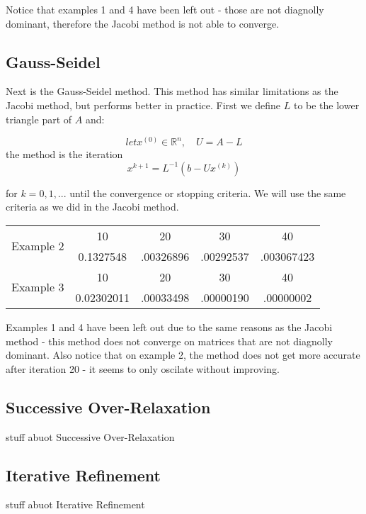 \documentclass[11pt]{article}	%
\begin{document}
    Notice that examples 1 and 4 have been left out - those are not diagnolly dominant, therefore the Jacobi method
    is not able to converge.

\subsection{Gauss-Seidel}
Next is the Gauss-Seidel method. This method has similar limitations as the Jacobi method, but performs better in practice.
First we define $L$ to be the lower triangle part of $A$ and:

\begin{equation}\label{eq:jacobi-eq-1}
    let x^{(0)}\in {\mathbb R}^n, \quad U = A - L
\end{equation}
the method is the iteration
\begin{equation}\label{eq:jacobi-eq-1}
    x^{k+1} = L^{-1}(b - Ux^{(k)})
\end{equation}

for $k = 0, 1, ...$ until the convergence or stopping criteria. We will use the same criteria as we did in the Jacobi method.

\begin{center}
    \begin{tabular}{||c|c|c|c|c||}
        \hline
        \multirow{2}{5em}{Example 2} & 10 & 20 & 30 & 40 \\ [.25em]
        & 0.1327548 & .00326896 & .00292537 & .003067423 \\ [.25em]
        \hline \hline
        \multirow{2}{5em}{Example 3} & 10 & 20 & 30 & 40 \\ [.25em]
        & 0.02302011 & .00033498 & .00000190 & .00000002 \\ [.25em]
        \hline
    \end{tabular}
\end{center}
Examples 1 and 4 have been left out due to the same reasons as the Jacobi method - this method does not converge on matrices that are not diagnolly dominant. Also notice that on example 2, the method does not get more accurate after iteration 20 - it seems to only oscilate without improving.

\subsection{Successive Over-Relaxation}
stuff abuot Successive Over-Relaxation

\subsection{Iterative Refinement}
stuff abuot Iterative Refinement
\end{document}
